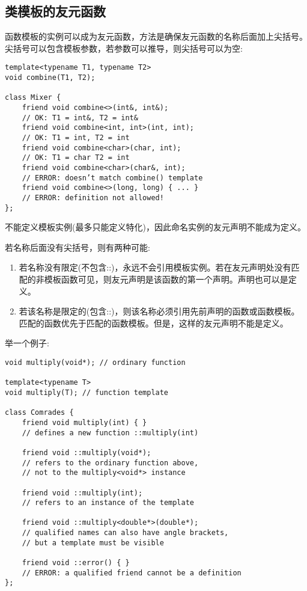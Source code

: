 \subsection{类模板的友元函数}

函数模板的实例可以成为友元函数，方法是确保友元函数的名称后面加上尖括号。尖括号可以包含模板参数，若参数可以推导，则尖括号可以为空:

\begin{lstlisting}[style=styleCXX]
template<typename T1, typename T2>
void combine(T1, T2);

class Mixer {
	friend void combine<>(int&, int&);
	// OK: T1 = int&, T2 = int&
	friend void combine<int, int>(int, int);
	// OK: T1 = int, T2 = int
	friend void combine<char>(char, int);
	// OK: T1 = char T2 = int
	friend void combine<char>(char&, int);
	// ERROR: doesn’t match combine() template
	friend void combine<>(long, long) { ... }
	// ERROR: definition not allowed!
};
\end{lstlisting}

不能定义模板实例(最多只能定义特化)，因此命名实例的友元声明不能成为定义。

若名称后面没有尖括号，则有两种可能:

\begin{enumerate}
\item 
若名称没有限定(不包含::)，永远不会引用模板实例。若在友元声明处没有匹配的非模板函数可见，则友元声明是该函数的第一个声明。声明也可以是定义。

\item 
若该名称是限定的(包含::)，则该名称必须引用先前声明的函数或函数模板。匹配的函数优先于匹配的函数模板。但是，这样的友元声明不能是定义。
\end{enumerate}

举一个例子:

\begin{lstlisting}[style=styleCXX]
void multiply(void*); // ordinary function

template<typename T>
void multiply(T); // function template

class Comrades {
	friend void multiply(int) { }
	// defines a new function ::multiply(int)
	
	friend void ::multiply(void*);
	// refers to the ordinary function above,
	// not to the multiply<void*> instance
	
	friend void ::multiply(int);
	// refers to an instance of the template
	
	friend void ::multiply<double*>(double*);
	// qualified names can also have angle brackets,
	// but a template must be visible
	
	friend void ::error() { }
	// ERROR: a qualified friend cannot be a definition
};
\end{lstlisting}

